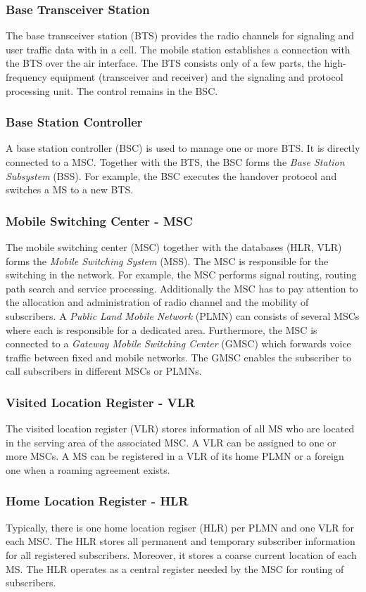\documentclass[master,english]{hgbthesis}
\begin{document}
\subsubsection{Base Transceiver Station}
The base transceiver station (BTS) provides the radio channels for signaling and user traffic data with in a cell. The mobile station establishes a connection with the BTS over the air interface. The BTS consists only of a few parts, the high-frequency equipment (transceiver and receiver) and the signaling and protocol processing unit. The control remains in the BSC.
\subsubsection{Base Station Controller }
A base station controller (BSC) is used to manage one or more BTS. It is directly connected to a MSC. Together with the BTS, the BSC forms the \emph{Base Station Subsystem} (BSS). For example, the BSC executes the handover protocol and switches a MS to a new BTS.
\subsubsection{Mobile Switching Center - MSC}
The mobile switching center (MSC) together with the databases (HLR, VLR) forms the \emph{Mobile Switching System} (MSS). The MSC is responsible for the switching in the network. For example, the MSC performs signal routing, routing path search and service processing. Additionally the MSC has to pay attention to the allocation and administration of radio channel and the mobility of subscribers. A \emph{Public Land Mobile Network} (PLMN) can consists of several MSCs where each is responsible for a dedicated area.
Furthermore, the MSC is connected to a \emph{Gateway Mobile Switching Center} (GMSC) which forwards voice traffic between fixed and mobile networks. The GMSC enables the subscriber to call subscribers in different MSCs or PLMNs.
\subsubsection{Visited Location Register - VLR}
The visited location register (VLR) stores information of all MS who are located in the serving area of the associated MSC. A VLR can be assigned to one or more MSCs. A MS can be registered in a VLR of its home PLMN or a foreign one when a roaming agreement exists.
\subsubsection{Home Location Register - HLR}
Typically, there is one home location regiser (HLR) per PLMN and one VLR for each MSC. The HLR stores all permanent and temporary subscriber information for all registered subscribers. Moreover, it stores a coarse current location of each MS. The HLR operates as a central register needed by the MSC for routing of subscribers.
\end{document}
